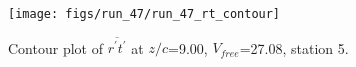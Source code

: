 \begin{figure}[H]
\centering
\texttt{[image: figs/run\_47/run\_47\_rt\_contour]}
\caption{Contour plot of $\overline{r^\prime t^\prime}$ at $z/c$=9.00, $V_{free}$=27.08, station 5.}
\label{fig:run_47_rt_contour}
\end{figure}


